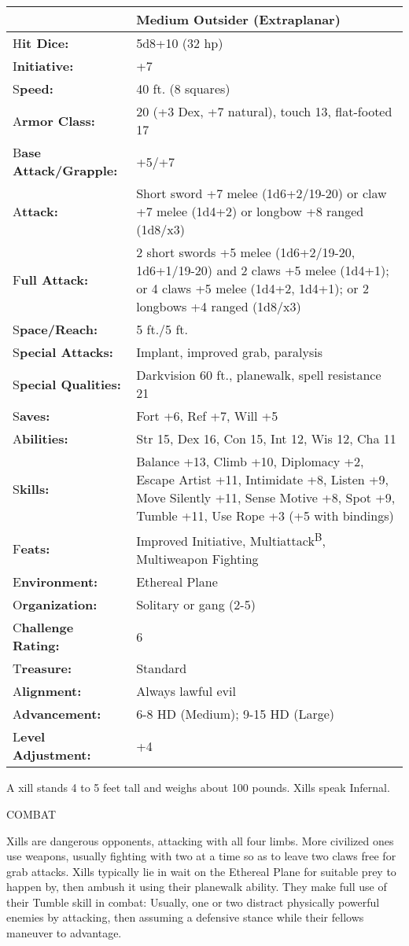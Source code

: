 \documentclass{article}
\begin{document}
\begin{tabular}{|>{\raggedright}p{91pt}|>{\raggedright}p{223pt}|}
\hline
  & Medium Outsider (Extraplanar)\tabularnewline
\hline
H\textbf{it Dice:} & 5d8+10 (32 hp)\tabularnewline
\hline
I\textbf{nitiative:} & +7\tabularnewline
\hline
S\textbf{peed:} & 40 ft. (8 squares)\tabularnewline
\hline
A\textbf{rmor Class:} & 20 (+3 Dex, +7 natural), touch 13, flat-footed 17\tabularnewline
\hline
B\textbf{ase Attack/Grapple:} & +5/+7\tabularnewline
\hline
A\textbf{ttack:} & Short sword +7 melee (1d6+2/19-20) or claw +7 melee (1d4+2) 
or longbow +8 ranged (1d8/x3)\tabularnewline
\hline
F\textbf{ull Attack:} & 2 short swords +5 melee (1d6+2/19-20, 1d6+1/19-20) and 
2 claws +5 melee (1d4+1); or 4 claws +5 melee (1d4+2, 1d4+1); or 2 longbows +4 
ranged (1d8/x3)\tabularnewline
\hline
S\textbf{pace/Reach:} & 5 ft./5 ft.\tabularnewline
\hline
S\textbf{pecial Attacks:} & Implant, improved grab, paralysis\tabularnewline
\hline
S\textbf{pecial Qualities:} & Darkvision 60 ft., planewalk, spell resistance 21\tabularnewline
\hline
S\textbf{aves:} & Fort +6, Ref +7, Will +5\tabularnewline
\hline
A\textbf{bilities:} & Str 15, Dex 16, Con 15, Int 12, Wis 12, Cha 11\tabularnewline
\hline
S\textbf{kills:} & Balance +13, Climb +10, Diplomacy +2, Escape Artist +11, Intimidate 
+8, Listen +9, Move Silently +11, Sense Motive +8, Spot +9, Tumble +11, Use Rope 
+3 (+5 with bindings) \tabularnewline
\hline
F\textbf{eats:} & Improved Initiative, Multiattack\textsuperscript{B}, Multiweapon 
Fighting\tabularnewline
\hline
E\textbf{nvironment:} & Ethereal Plane\tabularnewline
\hline
O\textbf{rganization:} & Solitary or gang (2-5)\tabularnewline
\hline
C\textbf{hallenge Rating:} & 6\tabularnewline
\hline
T\textbf{reasure:} & Standard\tabularnewline
\hline
A\textbf{lignment:} & Always lawful evil\tabularnewline
\hline
A\textbf{dvancement:} & 6-8 HD (Medium); 9-15 HD (Large)\tabularnewline
\hline
L\textbf{evel Adjustment:} & +4\tabularnewline
\hline
\end{tabular}

A xill stands 4 to 5 feet tall and weighs about 100 pounds. Xills speak Infernal.

COMBAT

Xills are dangerous opponents, attacking with all four limbs. More civilized ones 
use weapons, usually fighting with two at a time so as to leave two claws free 
for grab attacks. Xills typically lie in wait on the Ethereal Plane for suitable 
prey to happen by, then ambush it using their planewalk ability. They make full 
use of their Tumble skill in combat: Usually, one or two distract physically powerful 
enemies by attacking, then assuming a defensive stance while their fellows maneuver 
to advantage. 
\end{document}
